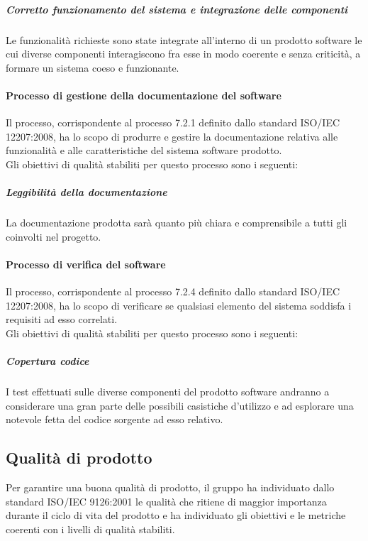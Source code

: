 				\subparagraph{Corretto funzionamento del sistema e integrazione delle componenti}
				Le funzionalità richieste sono state integrate all'interno di un prodotto software le cui diverse componenti interagiscono fra esse in modo coerente e senza criticità, a formare un sistema coeso e funzionante.
			
			\paragraph{Processo di gestione della documentazione del software}
			Il processo, corrispondente al processo 7.2.1 definito dallo standard ISO/IEC 12207:2008, ha lo scopo di produrre e gestire la documentazione relativa alle funzionalità e alle caratteristiche del sistema software prodotto.
			\\Gli obiettivi di qualità stabiliti per questo processo sono i seguenti:

				\subparagraph{Leggibilità della documentazione}
				La documentazione prodotta sarà quanto più chiara e comprensibile a tutti gli  coinvolti nel progetto.
			
			\paragraph{Processo di verifica del software}
			Il processo, corrispondente al processo 7.2.4 definito dallo standard ISO/IEC 12207:2008, ha lo scopo di verificare se qualsiasi elemento del sistema soddisfa i requisiti ad esso correlati.
			\\Gli obiettivi di qualità stabiliti per questo processo sono i seguenti:

				\subparagraph{Copertura codice}
				I test effettuati sulle diverse componenti del prodotto software andranno a considerare una gran parte delle possibili casistiche d'utilizzo e ad esplorare una notevole fetta del codice sorgente ad esso relativo.
	
	\subsection{Qualità di prodotto}
	Per garantire una buona qualità di prodotto, il gruppo \hx{} ha individuato dallo standard ISO/IEC 9126:2001 le qualità che ritiene di maggior importanza durante il ciclo di vita del prodotto e ha individuato gli obiettivi e le metriche coerenti con i livelli di qualità stabiliti.

